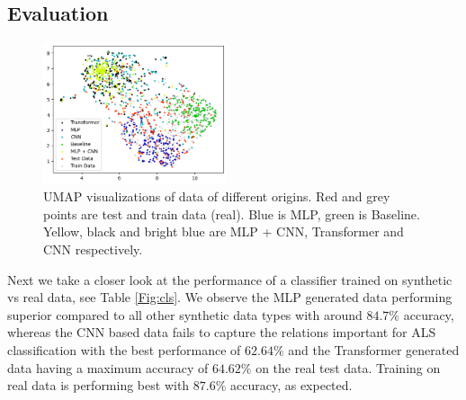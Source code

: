 \subsection{Evaluation}

\begin{figure}
  \centering
  \includegraphics[width = 0.48\textwidth]{figures/umap.png}
  \caption{UMAP visualizations of data of different origins. Red and grey points are test and train data (real). Blue is MLP, green is Baseline. Yellow, black and bright blue are MLP + CNN, Transformer and CNN respectively.}
  \label{fig:umap}
\end{figure}
Next we take a closer look at the performance of a classifier trained on synthetic vs real data, see Table \ref{Fig:cls}. We observe the MLP generated data performing superior compared to all other synthetic data types with around $84.7\%$ accuracy, whereas the CNN based data fails to capture the relations important for ALS classification with the best performance of $62.64\%$ and the Transformer generated data having a maximum accuracy of $64.62\%$ on the real test data.
Training on real data is performing best with $87.6\%$ accuracy, as expected.


